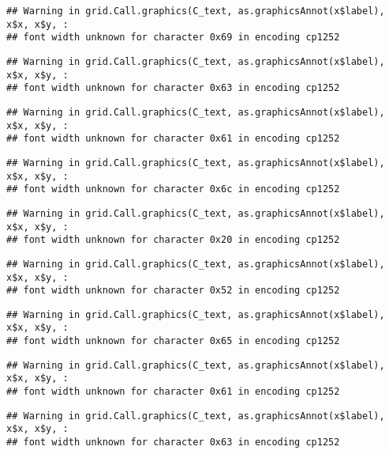 \documentclass[
]{article}
\begin{document}
\begin{verbatim}
## Warning in grid.Call.graphics(C_text, as.graphicsAnnot(x$label), x$x, x$y, :
## font width unknown for character 0x69 in encoding cp1252
\end{verbatim}

\begin{verbatim}
## Warning in grid.Call.graphics(C_text, as.graphicsAnnot(x$label), x$x, x$y, :
## font width unknown for character 0x63 in encoding cp1252
\end{verbatim}

\begin{verbatim}
## Warning in grid.Call.graphics(C_text, as.graphicsAnnot(x$label), x$x, x$y, :
## font width unknown for character 0x61 in encoding cp1252
\end{verbatim}

\begin{verbatim}
## Warning in grid.Call.graphics(C_text, as.graphicsAnnot(x$label), x$x, x$y, :
## font width unknown for character 0x6c in encoding cp1252
\end{verbatim}

\begin{verbatim}
## Warning in grid.Call.graphics(C_text, as.graphicsAnnot(x$label), x$x, x$y, :
## font width unknown for character 0x20 in encoding cp1252
\end{verbatim}

\begin{verbatim}
## Warning in grid.Call.graphics(C_text, as.graphicsAnnot(x$label), x$x, x$y, :
## font width unknown for character 0x52 in encoding cp1252
\end{verbatim}

\begin{verbatim}
## Warning in grid.Call.graphics(C_text, as.graphicsAnnot(x$label), x$x, x$y, :
## font width unknown for character 0x65 in encoding cp1252
\end{verbatim}

\begin{verbatim}
## Warning in grid.Call.graphics(C_text, as.graphicsAnnot(x$label), x$x, x$y, :
## font width unknown for character 0x61 in encoding cp1252
\end{verbatim}

\begin{verbatim}
## Warning in grid.Call.graphics(C_text, as.graphicsAnnot(x$label), x$x, x$y, :
## font width unknown for character 0x63 in encoding cp1252
\end{verbatim}
\end{document}
